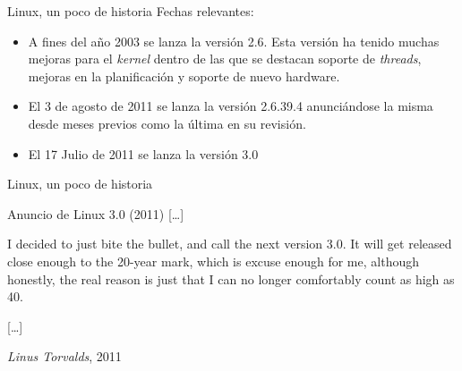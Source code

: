 \begin{frame}{Linux, un poco de historia}
Fechas relevantes:
\begin{itemize}
\item A fines del año 2003 se lanza la versión 2.6. Esta versión ha tenido
  muchas mejoras para el \textit{kernel} dentro de las que se destacan
  soporte de \textit{threads}, mejoras en la planificación y soporte de
  nuevo hardware.

\item El 3 de agosto de 2011 se lanza la versión 2.6.39.4 anunciándose la
  misma desde meses previos como la última en su revisión.

\item El 17 Julio de 2011 se lanza la versión 3.0
\end{itemize}
\end{frame}

\begin{frame}{Linux, un poco de historia}
\begin{block}{Anuncio de Linux 3.0 \hfill (2011)}
  [\ldots]

  I decided to just bite the bullet, and call the next version 3.0. It will
  get released close enough to the 20-year mark, which is excuse enough for
  me, although honestly, the real reason is just that I can no longer
  comfortably count as high as 40.

  [\ldots]

  \hfill \emph{Linus Torvalds},  2011 \cite{Torvalds2011}
\end{block}
\end{frame}

